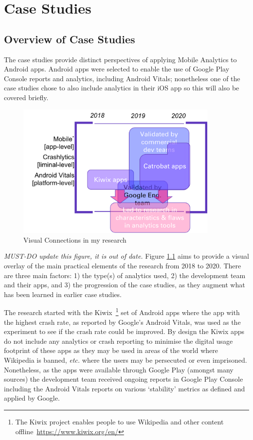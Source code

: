 \chapter{Case Studies}
\section{Overview of Case Studies}
The case studies provide %
distinct perspectives of applying Mobile Analytics to Android apps. Android apps were selected to enable the use of Google Play Console reports and analytics, including Android Vitals; nonetheless one of the case studies chose to also include analytics in their iOS app so this will also be covered briefly.

\begin{figure}[htbp!]
    \centering
    \includegraphics[width=10cm]{images/visual-connections-in-research.png}
    \caption{Visual Connections in my research}
    \label{fig:visual-connections-in-research}
\end{figure}

\textit{MUST-DO update this figure, it is out of date.} Figure \ref{fig:visual-connections-in-research}  aims to provide a visual overlay of the main practical elements of the research from 2018 to 2020. There are three main factors: 1) the type(s) of analytics used, 2) the development team and their apps, and 3) the progression of the case studies, as they augment what has been learned in earlier case studies.

The research started with the Kiwix~\footnote{The Kiwix project enables people to use Wikipedia and other content offline~\url{https://www.kiwix.org/en/}} set of Android apps where the app with the highest crash rate, as reported by Google's Android Vitals, was used as the experiment to see if the crash rate could be improved. By design the Kiwix apps do not include any analytics or crash reporting to minimise the digital usage footprint of these apps as they may be used in areas of the world where Wikipedia is banned, \emph{etc.} where the users may be persecuted or even imprisoned. Nonetheless, as the apps were available through Google Play (amongst many sources) the development team received ongoing reports in Google Play Console including the Android Vitals reports on various `stability' metrics as defined and applied by Google.

